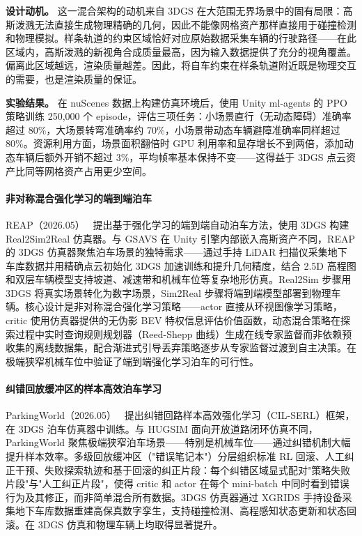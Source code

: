 \textbf{设计动机。} 这一混合架构的动机来自 3DGS 在大范围无界场景中的固有局限：高斯泼溅无法直接生成物理精确的几何，因此不能像网格资产那样直接用于碰撞检测和物理模拟。样条轨道的约束区域恰好对应原始数据采集车辆的行驶路径——在此区域内，高斯泼溅的新视角合成质量最高，因为输入数据提供了充分的视角覆盖。偏离此区域越远，渲染质量越差。因此，将自车约束在样条轨道附近既是物理交互的需要，也是渲染质量的保证。

\textbf{实验结果。} 在 nuScenes 数据上构建仿真环境后，使用 Unity ml-agents 的 PPO 策略训练 250,000 个 episode，评估三项任务：小场景直行（无动态障碍）准确率超过 80\%，大场景转弯准确率约 70\%，小场景带动态车辆避障准确率同样超过 80\%。资源利用方面，场景面积翻倍时 GPU 利用率和显存增长不到两倍，添加动态车辆后额外开销不超过 3\%，平均帧率基本保持不变——这得益于 3DGS 点云资产比同等网格资产占用更少空间。

\paragraph{非对称混合强化学习的端到端泊车}

REAP（2026.05）~\cite{2605_08713} 提出基于强化学习的端到端自动泊车方法，使用 3DGS 构建 Real2Sim2Real 仿真器。与 GSAVS 在 Unity 引擎内部嵌入高斯资产不同，REAP 的 3DGS 仿真器聚焦泊车场景的独特需求——通过手持 LiDAR 扫描仪采集地下车库数据并用精确点云初始化 3DGS 加速训练和提升几何精度，结合 2.5D 高程图和双层车辆模型支持坡道、减速带和机械车位等复杂地形仿真。Real2Sim 步骤用 3DGS 将真实场景转化为数字场景，Sim2Real 步骤将端到端模型部署到物理车辆。核心设计是非对称混合强化学习策略——actor 直接从环视图像学习策略，critic 使用仿真器提供的无伪影 BEV 特权信息评估价值函数，动态混合策略在探索过程中实时查询规则规划器（Reed-Shepp 曲线）生成在线专家监督而非依赖预收集的离线数据集，配合渐进式引导丢弃策略逐步从专家监督过渡到自主决策。在极端狭窄机械车位中验证了端到端强化学习泊车的可行性。

\paragraph{纠错回放缓冲区的样本高效泊车学习}

ParkingWorld（2026.05）~\cite{2605_25029} 提出纠错回路样本高效强化学习（CIL-SERL）框架，在 3DGS 泊车仿真器中训练。与 HUGSIM 面向开放道路闭环仿真不同，ParkingWorld 聚焦极端狭窄泊车场景——特别是机械车位——通过纠错机制大幅提升样本效率。多级回放缓冲区（"错误笔记本"）分层组织标准 RL 回滚、人工纠正干预、失败探索轨迹和基于回滚的纠正片段：每个纠错区域显式配对"策略失败片段"与"人工纠正片段"，使得 critic 和 actor 在每个 mini-batch 中同时看到错误行为及其修正，而非简单混合所有数据。3DGS 仿真器通过 XGRIDS 手持设备采集地下车库数据重建高保真数字孪生，支持碰撞检测、高程感知状态更新和状态回滚。在 3DGS 仿真和物理车辆上均取得显著提升。

